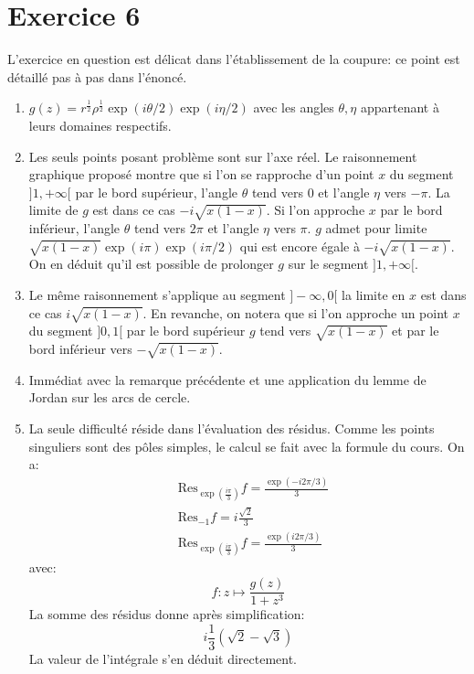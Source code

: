 \documentclass[a4paper,12pt]{amsart}
\theoremstyle{plain}
\theoremstyle{definition}
\theoremstyle{remark}
\begin{document}
\section*{Exercice 6}
L'exercice en question est délicat dans l'établissement de la coupure: ce point est détaillé pas 
à pas dans l'énoncé.
\begin{enumerate}
\item $g(z)=r^{\frac{1}{2}}\rho^{\frac{1}{2}}\exp(i\theta/2)\exp(i\eta/2)$ avec les angles $\theta,\eta$
appartenant à leurs domaines respectifs.
\item Les seuls points posant problème sont sur l'axe réel. Le raisonnement graphique proposé montre
que si l'on se rapproche d'un point $x$ du segment $]1, +\infty[$ par le bord supérieur, l'angle
$\theta$ tend vers 0 et l'angle $\eta$ vers $-\pi$. La limite de $g$ est dans ce cas 
$-i\sqrt{x(1-x)}$. Si 
l'on approche $x$ par le bord inférieur, l'angle $\theta$ tend vers  $2\pi$ et l'angle $\eta$ vers 
$\pi$. $g$ admet pour limite $\sqrt{x(1-x)}\exp(i\pi)\exp(i\pi/2)$ qui est encore
égale à $-i\sqrt{x(1-x)}$. On en déduit qu'il est possible de prolonger $g$ sur le
segment $]1,+\infty[$. 
\item Le même raisonnement s'applique au segment $]-\infty,0[$ la limite en $x$
est dans ce cas $i\sqrt{x(1-x)}$. En revanche, on notera que si l'on approche un point $x$ du segment $]0,1[$ par le bord supérieur $g$ tend vers $\sqrt{x(1-x)}$ et par le bord inférieur vers 
$-\sqrt{x(1-x)}$.
\item Immédiat avec la remarque précédente et une application du lemme de Jordan sur les arcs de cercle.
\item La seule difficulté réside dans l'évaluation des résidus. Comme les points singuliers sont
des pôles simples, le calcul se fait avec la formule du cours. On a:
\begin{align*}
& \text{Res}_{\exp\left(\frac{i \pi }{3}\right)}f=\frac{\exp\left(-i2\pi/3\right)}{3} \\
&\text{Res}_{-1}f = i\frac{\sqrt{2}}{3} \\
& \text{Res}_{\exp\left(\frac{i \pi }{3}\right)}f=\frac{\exp\left(i2\pi/3\right)}{3}
\end{align*}
avec:
\[
f \colon z \mapsto \frac{g(z)}{1+z^3}
\]
La somme des résidus donne après simplification:
\[
i \frac{1}{3} \left(\sqrt{2}-\sqrt{3}\right)
\]
La valeur de l'intégrale s'en déduit directement.
\end{enumerate}
\end{document}
